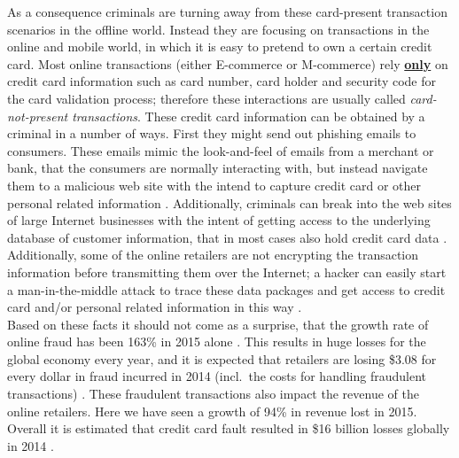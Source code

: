 As a consequence criminals are turning away from these card-present transaction scenarios in the offline world. Instead they are focusing on transactions in the online and mobile world, in which it is easy to pretend to own a certain credit card. Most online transactions (either \gls{E-commerce} or \gls{M-commerce}) rely \textbf{\underline{only}} on credit card information such as card number, card holder and security code for the card validation process; therefore these interactions are usually called \textit{card-not-present transactions}. These credit card information can be obtained by a criminal in a number of ways. First they might send out phishing emails to consumers. These emails mimic the look-and-feel of emails from a merchant or bank, that the consumers are normally interacting with, but instead navigate them to a malicious web site with the intend to capture credit card or other personal related information \citep{ConsumerAction2009}. Additionally, criminals can break into the web sites of large Internet businesses with the intent of getting access to the underlying database of customer information, that in most cases also hold credit card data \citep{Holmes2015}. Additionally, some of the online retailers are not encrypting the transaction information before transmitting them over the Internet; a hacker can easily start a man-in-the-middle attack to trace these data packages and get access to credit card and/or personal related information in this way \citep{Captain2015}. \\

Based on these facts it should not come as a surprise, that the growth rate of online fraud has been 163\% in 2015 alone \citep{PYMNTS2016}. This results in huge losses for the global economy every year, and it is expected that retailers are losing \$3.08 for every dollar in fraud incurred in 2014 (incl.\ the costs for handling fraudulent transactions) \citep{Rampton2015}. These fraudulent transactions also impact the revenue of the online retailers. Here we have seen a growth of 94\% in revenue lost in 2015. Overall it is estimated that credit card fault resulted in \$16 billion losses globally in 2014 \citep{PYMNTS2016} \citep{BusinessWire2015}. \\


